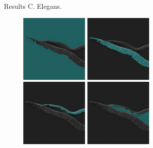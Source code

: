\documentclass[8pt]{beamer}
\begin{document}
\begin{frame}{Results}
   C. Elegans.

   \begin{figure}[ht]
      \centering
      \includegraphics[width=0.3\textwidth]{two_c_elegans_seg_blend_0000.png} \hspace{0.45cm}
      \includegraphics[width=0.3\textwidth]{two_c_elegans_seg_blend_0001.png} \\[0.56cm]
      \includegraphics[width=0.3\textwidth]{two_c_elegans_seg_blend_0002.png} \hspace{0.45cm}
      \includegraphics[width=0.3\textwidth]{two_c_elegans_seg_blend_0003.png}
   \end{figure}
\end{frame}
\end{document}
